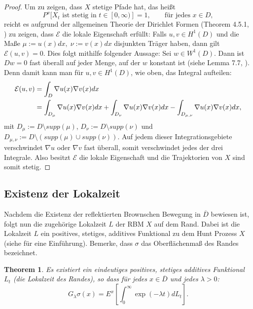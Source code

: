 \documentclass[10pt, a4paper, leqno, twoside, bibliography=totocnumbered, final]{scrartcl}
\theoremstyle{definition}
\theoremstyle{plain}%
\newtheorem{thm}[defin]{Theorem}
\theoremstyle{remark}
\begin{document}
\begin{proof}
Um zu zeigen, dass $X$ stetige Pfade hat, das heißt
\begin{equation}
P^x[X_t \text{ ist stetig in } t \in [0, \infty)] = 1, \qquad \text{für jedes } x \in D,
\end{equation}
reicht es aufgrund der allgemeinen Theorie der Dirichlet Formen (Theorem 4.5.1, \cite{Fukushima}) zu zeigen, dass $ \mathcal{E} $ die lokale Eigenschaft erfüllt: Falls $ u,v \in H^1(D) $ und die Maße $ \mu := u(x)dx, \; \nu := v(x)dx $ disjunkten Träger haben, dann gilt $ \mathcal{E}(u,v) = 0 $. 
Dies folgt mithilfe folgender Aussage: Sei $ w \in W^1(D) $. Dann ist $ Dw = 0 $ fast überall auf jeder Menge, auf der $w$ konstant ist (siehe Lemma 7.7, \cite{Gilbarg-Trudinger}). Denn damit kann man für $ u,v \in H^1(D) $, wie oben, das Integral aufteilen:
\begin{align*}
\mathcal{E}(u,v) & = \int_D \nabla u(x) \nabla v(x) dx \\
& = \int_{D_{\mu}} \nabla u(x) \nabla v(x) dx + \int_{D_{\nu}} \nabla u(x) \nabla v(x) dx \-- \int_{D_{\mu , \nu}} \nabla u(x) \nabla v(x) dx,
\end{align*}
mit $ D_{\mu} := D \setminus supp (\mu) $, $ D_{\nu} := D \setminus supp (\nu) $ und $ D_{\mu , \nu} := D \setminus ( supp (\mu) \cup supp (\nu) ) $. Auf jedem dieser Integrationsgebiete verschwindet $ \nabla u $ oder $ \nabla v $ fast überall, somit verschwindet jedes der drei Integrale. Also besitzt $ \mathcal{E} $ die lokale Eigenschaft und die Trajektorien von $X$ sind somit stetig.

\end{proof}



\subsection{Existenz der Lokalzeit}
\label{sec:Thm_Lokalzeit}

Nachdem die Existenz der reflektierten Brownschen Bewegung in $ \overline{D} $ bewiesen ist, folgt nun die zugehörige Lokalzeit $L$ der RBM $X$ auf dem Rand. Dabei ist die Lokalzeit $L$ ein positives, stetiges, additives Funktional zu dem Hunt Prozess $X$ (siehe \cite{Fukushima} für eine Einführung). Bemerke, dass $ \sigma $ das Oberflächenmaß des Randes bezeichnet. 

\begin{thm}
\label{sec:Thm-Lokalzeit}
Es existiert ein eindeutiges positives, stetiges additives Funktional $ L_t $ (die Lokalzeit des Randes), so dass für jedes $ x \in \overline{D} $ und jedes $ \lambda > 0 $:
\begin{equation}
\label{eq:Thm-Lokalzeit-behauptung}
G_{\lambda}\sigma(x) = E^x \left[ \int_0^{\infty} \exp(- \lambda t) dL_t \right].
\end{equation}
\end{thm}
\end{document}
